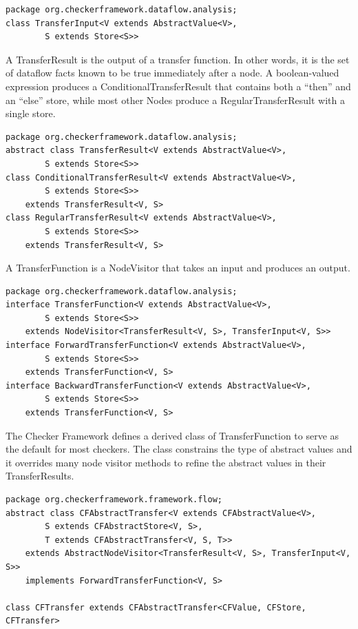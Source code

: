 \begin{verbatim}
package org.checkerframework.dataflow.analysis;
class TransferInput<V extends AbstractValue<V>,
        S extends Store<S>>
\end{verbatim}

\label{sec:transfer_result_classes}

A TransferResult is the output of a transfer function.  In other
words, it is the set of dataflow facts known to be true immediately
after a node.  A boolean-valued expression produces a
ConditionalTransferResult that contains both a ``then'' and an ``else''
store, while most other Nodes produce a RegularTransferResult with a
single store.

\begin{verbatim}
package org.checkerframework.dataflow.analysis;
abstract class TransferResult<V extends AbstractValue<V>,
        S extends Store<S>>
class ConditionalTransferResult<V extends AbstractValue<V>,
        S extends Store<S>>
    extends TransferResult<V, S>
class RegularTransferResult<V extends AbstractValue<V>,
        S extends Store<S>>
    extends TransferResult<V, S>
\end{verbatim}

\label{sec:transfer_function_classes}

A TransferFunction is a NodeVisitor that takes an input and produces an output.

\begin{verbatim}
package org.checkerframework.dataflow.analysis;
interface TransferFunction<V extends AbstractValue<V>,
        S extends Store<S>>
    extends NodeVisitor<TransferResult<V, S>, TransferInput<V, S>>
interface ForwardTransferFunction<V extends AbstractValue<V>,
        S extends Store<S>>
    extends TransferFunction<V, S>
interface BackwardTransferFunction<V extends AbstractValue<V>,
        S extends Store<S>>
    extends TransferFunction<V, S>
\end{verbatim}

The Checker Framework defines a derived class of TransferFunction to
serve as the default for most checkers.  The class constrains the type
of abstract values and it overrides many node visitor methods to
refine the abstract values in their TransferResults.

\begin{verbatim}
package org.checkerframework.framework.flow;
abstract class CFAbstractTransfer<V extends CFAbstractValue<V>,
        S extends CFAbstractStore<V, S>,
        T extends CFAbstractTransfer<V, S, T>>
    extends AbstractNodeVisitor<TransferResult<V, S>, TransferInput<V, S>>
    implements ForwardTransferFunction<V, S>

class CFTransfer extends CFAbstractTransfer<CFValue, CFStore, CFTransfer>
\end{verbatim}

